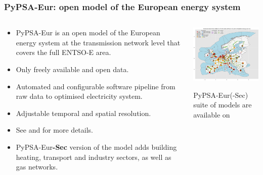 \begin{frame}
  \frametitle{PyPSA-Eur: open model of the European energy system}

  \begin{columns}[T]
  \begin{column}{7cm}
  {\small
  \begin{itemize}
  \item PyPSA-Eur is an open model of the European energy system at the transmission network 
  level that covers the full ENTSO-E area.
  \item Only freely available and open data.
  \item Automated and configurable software pipeline from raw data to optimised electricity system.
  \item Adjustable temporal and spatial resolution.
  \item See 
  and  
  for more details.
  \item PyPSA-Eur{\bf-Sec} version of the model adds building heating, transport and industry sectors, as well as gas networks.
  \end{itemize}
  }
  \end{column}

  \begin{column}{9cm}
    \centering
  {\footnotesize
    \includegraphics[width=8cm]{images/elec_s_100.png}
  
   \vspace{0.1cm}
   PyPSA-Eur(-Sec) suite of models are available on 
  }
  \end{column}
  
  \end{columns}

\end{frame}



